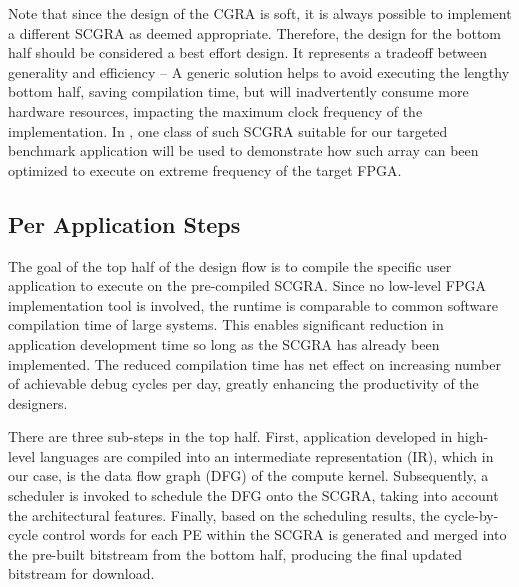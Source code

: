 Note that since the design of the CGRA is soft, it is always possible to implement a different SCGRA as deemed appropriate.  Therefore, the design for the bottom half should be considered a best effort design.  It represents a tradeoff between generality and efficiency -- A generic solution helps to avoid executing the lengthy bottom half, saving compilation time, but will inadvertently consume more hardware resources, impacting the maximum clock frequency of the implementation.  In , one class of such SCGRA suitable for our targeted benchmark application will be used to demonstrate how such array can been optimized to execute on extreme frequency of the target FPGA.

\subsection{Per Application Steps}
The goal of the top half of the design flow is to compile the specific user application to execute on the pre-compiled SCGRA.  Since no low-level FPGA implementation tool is involved, the runtime is comparable to common software compilation time of large systems.  This enables significant reduction in application development time so long as the SCGRA has already been implemented.  The reduced compilation time has net effect on increasing number of achievable debug cycles per day, greatly enhancing the productivity of the designers.

There are three sub-steps in the top half.  First, application developed in high-level languages are compiled into an intermediate representation (IR), which in our case, is the data flow graph (DFG) of the compute kernel.  Subsequently, a scheduler is invoked to schedule the DFG onto the SCGRA, taking into account the architectural features.  Finally, based on the scheduling results, the cycle-by-cycle control words for each PE within the SCGRA is generated and merged into the pre-built bitstream from the bottom half, producing the final updated bitstream for download.




